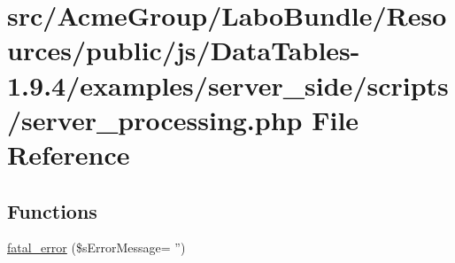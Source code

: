 \hypertarget{examples_2server__side_2scripts_2server__processing_8php}{\section{src/\+Acme\+Group/\+Labo\+Bundle/\+Resources/public/js/\+Data\+Tables-\/1.9.4/examples/server\+\_\+side/scripts/server\+\_\+processing.php File Reference}
\label{examples_2server__side_2scripts_2server__processing_8php}
}
\subsection*{Functions}
\begin{DoxyCompactItemize}
\item 
\hyperlink{examples_2server__side_2scripts_2server__processing_8php_a1bb235f2e57f0389e14b11592d32119a}{fatal\+\_\+error} (\$s\+Error\+Message= '')
\end{DoxyCompactItemize}
